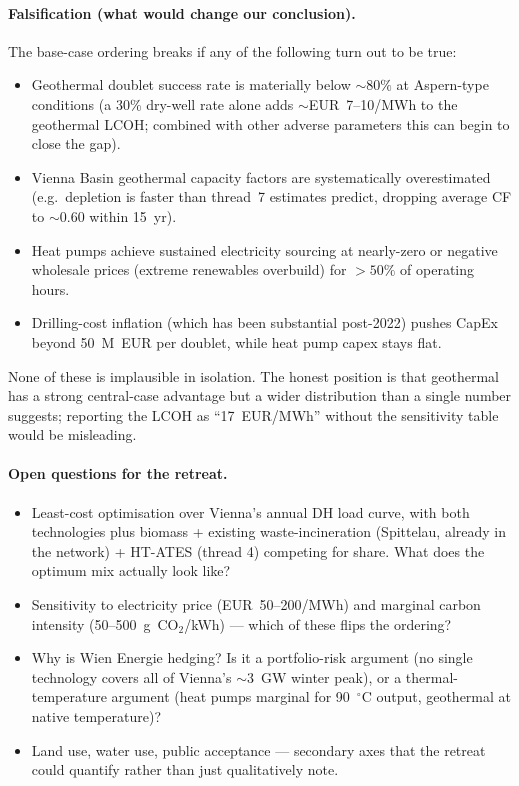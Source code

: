 \documentclass{article}
\begin{document}
\paragraph{Falsification (what would change our conclusion).}
The base-case ordering breaks if any of the following turn out to
be true:
\begin{itemize}
\item Geothermal doublet success rate is materially below
$\sim 80\%$ at Aspern-type conditions (a 30\% dry-well rate alone
adds $\sim$EUR~7--10/MWh to the geothermal LCOH; combined with
other adverse parameters this can begin to close the gap).
\item Vienna Basin geothermal capacity factors are systematically
overestimated (e.g.\ depletion is faster than thread~7 estimates
predict, dropping average CF to $\sim 0.60$ within 15~yr).
\item Heat pumps achieve sustained electricity sourcing at
nearly-zero or negative wholesale prices (extreme renewables
overbuild) for $> 50\%$ of operating hours.
\item Drilling-cost inflation (which has been substantial
post-2022) pushes CapEx beyond 50~M~EUR per doublet, while heat
pump capex stays flat.
\end{itemize}
None of these is implausible in isolation. The honest position is
that geothermal has a strong central-case advantage but a wider
distribution than a single number suggests; reporting the LCOH
as ``17~EUR/MWh'' without the sensitivity table would be
misleading.

\paragraph{Open questions for the retreat.}
\begin{itemize}
\item Least-cost optimisation over Vienna's annual DH load curve, with
both technologies plus biomass + existing waste-incineration (Spittelau,
already in the network) + HT-ATES (thread 4) competing for share.
What does the optimum mix actually look like?
\item Sensitivity to electricity price (EUR~50--200/MWh) and marginal
carbon intensity (50--500~g~CO$_2$/kWh) --- which of these flips the
ordering?
\item Why is Wien Energie hedging? Is it a portfolio-risk argument
(no single technology covers all of Vienna's $\sim 3$~GW winter peak),
or a thermal-temperature argument (heat pumps marginal for 90~$^\circ$C
output, geothermal at native temperature)?
\item Land use, water use, public acceptance --- secondary axes that
the retreat could quantify rather than just qualitatively note.
\end{itemize}
\end{document}
